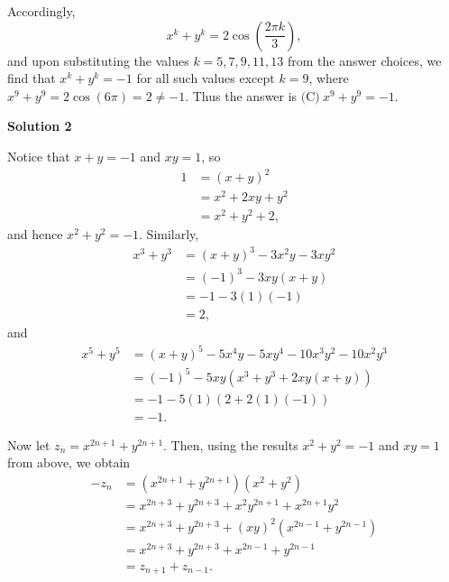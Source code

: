 \begin{enumerate}
 Accordingly, 
 \[x^k+y^k = 2\cos\left(\frac{2\pi k}{3}\right),\] and upon substituting the values $k = 5,7,9,11,13$ from the answer choices, we find that $x^k+y^k = -1$ for all such values except $k = 9$, where $x^9+y^9 = 2\cos(6\pi) = 2 \neq -1$. Thus the answer is $\boxed{\text{(C)} \ x^9+y^9 = -1}$.

 



\textbf{Solution 2}

Notice that $x+y = -1$ and $xy = 1$, so 
 \begin{align*}1 &=(x+y)^2 \\ &= x^2+2xy+y^2 \\ &=x^2+y^2+2,\end{align*}
 and hence $x^2+y^2=-1$. Similarly, 
 \begin{align*}x^3+y^3 &= (x+y)^3-3x^2y-3xy^2 \\ &= \left(-1\right)^3-3xy(x+y) \\ &= -1-3(1)\left(-1\right) \\ &=2,\end{align*}
 and 
 \begin{align*}x^5+y^5 &= (x+y)^5-5x^4y-5xy^4-10x^3y^2-10x^2y^3 \\ &= \left(-1\right)^5-5xy\left(x^3+y^3+2xy\left(x+y\right)\right) \\ &= -1-5(1)\left(2+2\left(1\right)\left(-1\right)\right) \\ &=-1.\end{align*}


 Now let $z_n = x^{2n+1}+y^{2n+1}$. Then, using the results $x^2+y^2 = -1$ and $xy = 1$ from above, we obtain 
 \begin{align*}-z_n &= \left(x^{2n+1}+y^{2n+1}\right)\left(x^2+y^2\right) \\ &= x^{2n+3}+y^{2n+3}+x^2y^{2n+1}+x^{2n+1}y^2 \\ &= x^{2n+3}+y^{2n+3}+\left(xy\right)^2\left(x^{2n-1}+y^{2n-1}\right) \\ &= x^{2n+3}+y^{2n+3}+x^{2n-1}+y^{2n-1} \\ &= z_{n+1}+z_{n-1}.\end{align*}



\end{enumerate}
